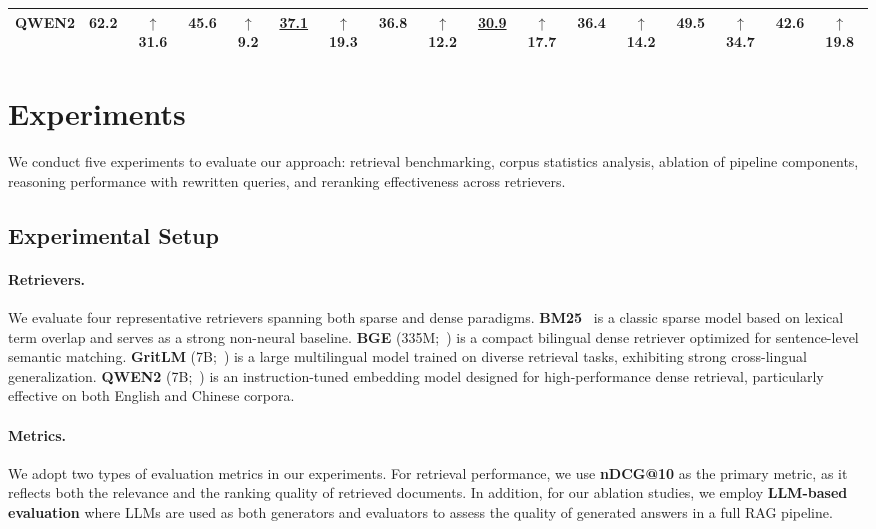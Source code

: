 \documentclass[11pt]{article}
\begin{document}
\begin{table}[t]
\begin{adjustbox}{width=1.0\linewidth}
\begin{tabular}{l*{8}{c c}}
QWEN2   & \textbf{62.2} & {\color{red}$\uparrow$ 31.6} & \textbf{45.6} & {\color{red}$\uparrow$ 9.2}  & \underline{37.1} & {\color{red}$\uparrow$ 19.3} & \textbf{36.8} & {\color{red}$\uparrow$ 12.2} & \underline{30.9} & {\color{red}$\uparrow$ 17.7} & \textbf{36.4} & {\color{red}$\uparrow$ 14.2} & \textbf{49.5} & {\color{red}$\uparrow$ 34.7} & \textbf{42.6} & {\color{red}$\uparrow$ 19.8} \\
\bottomrule
\end{tabular}
\end{adjustbox}
\end{table}

\section{Experiments}
We conduct five experiments to evaluate our approach: retrieval benchmarking, corpus statistics analysis, ablation of pipeline components, reasoning performance with rewritten queries, and reranking effectiveness across retrievers.


\subsection{Experimental Setup}
\paragraph{Retrievers.}
We evaluate four representative retrievers spanning both sparse and dense paradigms. \textbf{BM25}~\citep{robertson2009probabilistic} is a classic sparse model based on lexical term overlap and serves as a strong non-neural baseline. \textbf{BGE} (335M;~\citealp{xiao2023BGE}) is a compact bilingual dense retriever optimized for sentence-level semantic matching. \textbf{GritLM} (7B;~\citealp{muennighoff2024gritlm}) is a large multilingual model trained on diverse retrieval tasks, exhibiting strong cross-lingual generalization. \textbf{QWEN2} (7B;~\citealp{qwen2}) is an instruction-tuned embedding model designed for high-performance dense retrieval, particularly effective on both English and Chinese corpora.


\paragraph{Metrics.}
We adopt two types of evaluation metrics in our experiments. For retrieval performance, we use \textbf{nDCG@10} as the primary metric, as it reflects both the relevance and the ranking quality of retrieved documents. In addition, for our ablation studies, we employ \textbf{LLM-based evaluation} where LLMs are used as both generators and evaluators to assess the quality of generated answers in a full RAG pipeline.
\end{document}
